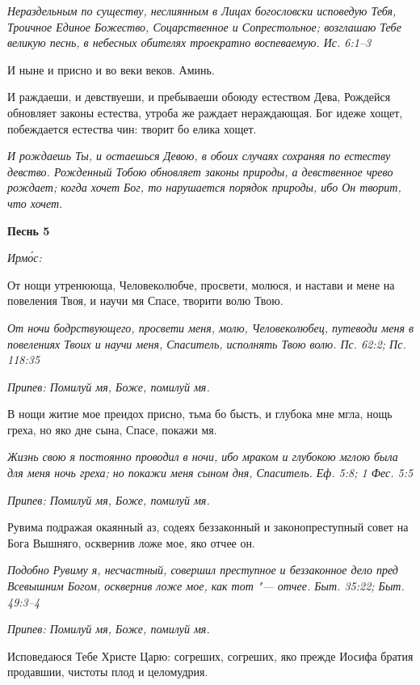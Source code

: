 \itshape Нераздельным по существу, неслиянным в Лицах богословски исповедую Тебя, Троичное Единое Божество, Соцарственное и Сопрестольное; возглашаю Тебе великую песнь, в небесных обителях троекратно воспеваемую. Ис. 6:1–3\normalfont{}


И ныне и присно и во веки веков. Аминь.


И раждаеши, и девствуеши, и пребываеши обоюду естеством Дева, Рождейся обновляет законы естества, утроба же раждает нераждающая. Бог идеже хощет, побеждается естества чин: творит бо елика хощет.


\itshape И рождаешь Ты, и остаешься Девою, в обоих случаях сохраняя по естеству девство. Рожденный Тобою обновляет законы природы, а девственное чрево рождает; когда хочет Бог, то нарушается порядок природы, ибо Он творит, что хочет.\normalfont{}





\bfseries Песнь 5\normalfont{}


\itshape Ирмо́с:\normalfont{}


От нощи утренююща, Человеколюбче, просвети, молюся, и настави и мене на повеления Твоя, и научи мя Спасе, творити волю Твою.


\itshape От ночи бодрствующего, просвети меня, молю, Человеколюбец, путеводи меня в повелениях Твоих и научи меня, Спаситель, исполнять Твою волю. Пс. 62:2; Пс. 118:35\normalfont{}


\itshape Припев:\normalfont{} Помилуй мя, Боже, помилуй мя.


В нощи житие мое преидох присно, тьма бо бысть, и глубока мне мгла, нощь греха, но яко дне сына, Спасе, покажи мя.


\itshape Жизнь свою я постоянно проводил в ночи, ибо мраком и глубокою мглою была для меня ночь греха; но покажи меня сыном дня, Спаситель. Еф. 5:8; 1 Фес. 5:5\normalfont{}


\itshape Припев:\normalfont{} Помилуй мя, Боже, помилуй мя.


Рувима подражая окаянный аз, содеях беззаконный и законопреступный совет на Бога Вышняго, осквернив ложе мое, яко отчее он.


\itshape Подобно Рувиму я, несчастный, совершил преступное и беззаконное дело пред Всевышним Богом, осквернив ложе мое, как тот "--- отчее. Быт. 35:22; Быт. 49:3–4\normalfont{}


\itshape Припев:\normalfont{} Помилуй мя, Боже, помилуй мя.


Исповедаюся Тебе Христе Царю: согреших, согреших, яко прежде Иосифа братия продавшии, чистоты плод и целомудрия.


